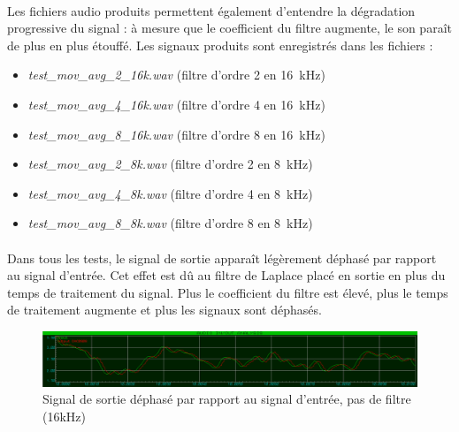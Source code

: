 \documentclass{article}
\begin{document}
    \paragraph{}
    Les fichiers audio produits permettent également d'entendre la dégradation progressive du signal : à mesure que le coefficient du filtre augmente, le son paraît de plus en plus étouffé. Les signaux produits sont enregistrés dans les fichiers :
    \begin{itemize}
        \item \emph{test\_mov\_avg\_2\_16k.wav} (filtre d'ordre 2 en \SI{16}{\kilo\hertz})
        \item \emph{test\_mov\_avg\_4\_16k.wav} (filtre d'ordre 4 en \SI{16}{\kilo\hertz})
        \item \emph{test\_mov\_avg\_8\_16k.wav} (filtre d'ordre 8 en \SI{16}{\kilo\hertz})
        \item \emph{test\_mov\_avg\_2\_8k.wav} (filtre d'ordre 2 en \SI{8}{\kilo\hertz})
        \item \emph{test\_mov\_avg\_4\_8k.wav} (filtre d'ordre 4 en \SI{8}{\kilo\hertz})
        \item \emph{test\_mov\_avg\_8\_8k.wav} (filtre d'ordre 8 en \SI{8}{\kilo\hertz})
    \end{itemize}

    \paragraph{}
    Dans tous les tests, le signal de sortie apparaît légèrement déphasé par rapport au signal d'entrée. Cet effet est dû au filtre de Laplace placé en sortie en plus du temps de traitement du signal. Plus le coefficient du filtre est élevé, plus le temps de traitement augmente et plus les signaux sont déphasés.

    \begin{figure}[H]
        \centering
        \includegraphics[width=\textwidth]{./images/out_no_filter_drake_16k.png}
        \caption{Signal de sortie déphasé par rapport au signal d'entrée, pas de filtre (16kHz)}
    \end{figure}
\end{document}
